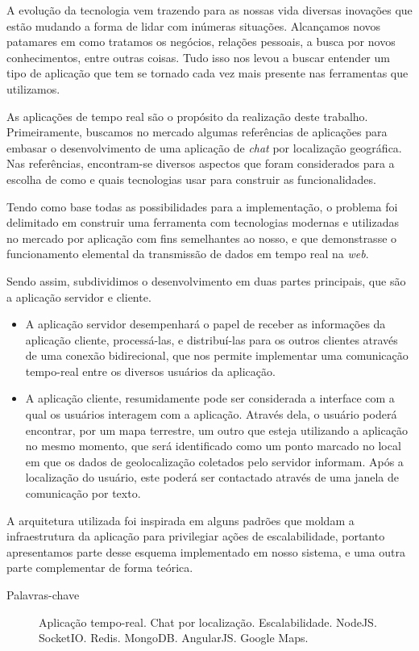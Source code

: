 \documentclass[brazil,ruledheader]{abntifes}
\begin{document}
	\begin{resumo}
		A evolução da tecnologia vem trazendo para as nossas vida diversas inovações que estão mudando a forma de lidar com inúmeras situações. Alcançamos novos patamares em como tratamos os negócios, relações pessoais, a busca por novos conhecimentos, entre outras coisas. Tudo isso nos levou a buscar entender um tipo de aplicação que tem se tornado cada vez mais presente nas ferramentas que utilizamos.
		
		As aplicações de tempo real são o propósito da realização deste trabalho. Primeiramente, buscamos no mercado algumas referências de aplicações para embasar o desenvolvimento de uma aplicação de \textit{chat} por localização geográfica. Nas referências, encontram-se diversos aspectos que foram considerados para a escolha de como e quais tecnologias usar para construir as funcionalidades.
		
		Tendo como base todas as possibilidades para a implementação, o problema foi delimitado em construir uma ferramenta com tecnologias modernas e utilizadas no mercado por aplicação com fins semelhantes ao nosso, e que demonstrasse o funcionamento elemental da transmissão de dados em tempo real na \textit{web}.
		
		Sendo assim, subdividimos o desenvolvimento em duas partes principais, que são a aplicação servidor e cliente. 
		
		\begin{itemize}
			\item A aplicação servidor desempenhará o papel de receber as informações da aplicação cliente, processá-las, e distribuí-las para os outros clientes através de uma conexão bidirecional, que nos permite implementar uma comunicação tempo-real entre os diversos usuários da aplicação.
		\end{itemize}
		
		\begin{itemize}
			\item  A aplicação cliente, resumidamente pode ser considerada a interface com a qual os usuários interagem com a aplicação. Através dela, o usuário poderá encontrar, por um mapa terrestre, um outro que esteja utilizando a aplicação no mesmo momento, que será identificado como um ponto marcado no local em que os dados de geolocalização coletados pelo servidor informam. Após a localização do usuário, este poderá ser contactado através de uma janela de comunicação por texto.
		\end{itemize}
		
		A arquitetura utilizada foi inspirada em alguns padrões que moldam a infraestrutura da aplicação para privilegiar ações de escalabilidade, portanto apresentamos parte desse esquema implementado em nosso sistema, e uma outra parte complementar de forma teórica.
		
		\begin{description}
			\item[Palavras-chave] Aplicação tempo-real. Chat por localização. Escalabilidade. NodeJS. SocketIO. Redis. MongoDB. AngularJS. Google Maps.
		\end{description}
		
	\end{resumo}
	
\end{document}
